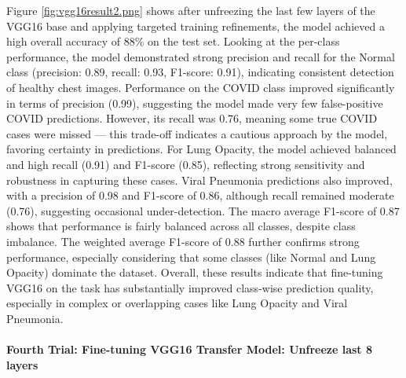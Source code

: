 \documentclass{article}
\begin{document}
Figure \ref{fig:vgg16result2.png} shows after unfreezing the last few layers of the VGG16 base and applying targeted training refinements, the model achieved a high overall accuracy of 88\% on the test set. Looking at the per-class performance, the model demonstrated strong precision and recall for the Normal class (precision: 0.89, recall: 0.93, F1-score: 0.91), indicating consistent detection of healthy chest images.
Performance on the COVID class improved significantly in terms of precision (0.99), suggesting the model made very few false-positive COVID predictions. However, its recall was 0.76, meaning some true COVID cases were missed — this trade-off indicates a cautious approach by the model, favoring certainty in predictions.
For Lung Opacity, the model achieved balanced and high recall (0.91) and F1-score (0.85), reflecting strong sensitivity and robustness in capturing these cases. Viral Pneumonia predictions also improved, with a precision of 0.98 and F1-score of 0.86, although recall remained moderate (0.76), suggesting occasional under-detection.
The macro average F1-score of 0.87 shows that performance is fairly balanced across all classes, despite class imbalance. The weighted average F1-score of 0.88 further confirms strong performance, especially considering that some classes (like Normal and Lung Opacity) dominate the dataset.
Overall, these results indicate that fine-tuning VGG16 on the task has substantially improved class-wise prediction quality, especially in complex or overlapping cases like Lung Opacity and Viral Pneumonia.

\paragraph{Fourth Trial: Fine-tuning VGG16 Transfer Model: Unfreeze last 8 layers}\mbox{}\\
\end{document}
